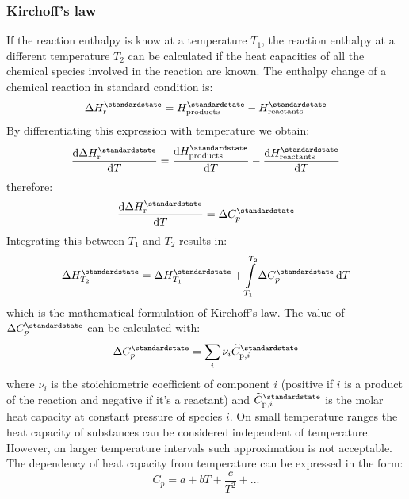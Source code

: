 \documentclass[12pt,a4paper]{report}
\newcommand*\diff{\mathop{}\!\mathrm{d}}
\begin{document}
   \subsubsection{Kirchoff's law}
   If the reaction enthalpy is know at a temperature $T_{1}$, the reaction enthalpy at a different temperature $T_{2}$ can be calculated if the heat capacities of all the chemical species involved in the reaction are known. The enthalpy change of a chemical reaction in standard condition is:
   \begin{equation*}
   \Delta H^{\standardstate}_{\mathrm{r}}=H^{\standardstate}_{\mathrm{products}}-H^{\standardstate}_{\mathrm{reactants}}
   \end{equation*}
   By differentiating this expression with temperature we obtain:
   \begin{equation*}
   \frac{\diff\Delta H^{\standardstate}_{\mathrm{r}}}{\diff T}=\frac{\diff H^{\standardstate}_{\mathrm{products}}}{\diff T}-\frac{\diff H^{\standardstate}_{\mathrm{reactants}}}{\diff T}
   \end{equation*}
   therefore:
   \begin{equation*}
   \frac{\diff\Delta H^{\standardstate}_{\mathrm{r}}}{\diff T}=\Delta C^{\standardstate}_{p}
   \end{equation*}
   Integrating this between $T_{1}$ and $T_{2}$ results in:
   \begin{equation*}
   \Delta H^{\standardstate}_{T_{2}}=\Delta H^{\standardstate}_{T_{1}}+\int\limits_{T_{1}}^{T_{2}}\Delta C^{\standardstate}_{p}\diff T
   \end{equation*}
   which is the mathematical formulation of Kirchoff's law.
   The value of $\Delta C^{\standardstate}_{p}$ can be calculated with:
   \begin{equation*}
   \Delta C^{\standardstate}_{p}=\sum\limits_{i}\nu_{i}\widetilde{C}^{\standardstate}_{\mathrm{p},i}
   \end{equation*}
   where $\nu_{i}$ is the stoichiometric coefficient of component $i$ (positive if $i$ is a product of the reaction and negative if it's a reactant) and $\widetilde{C}^{\standardstate}_{\mathrm{p},i}$ is the molar heat capacity at constant pressure of species $i$.
   On small temperature ranges the heat capacity of substances can be considered independent of temperature. However, on larger temperature intervals such approximation is not acceptable. The dependency of heat capacity from temperature can be expressed in the form:
  \begin{equation*}
  C_{p}=a+bT+\frac{c}{T^{2}}+...
  \end{equation*}
\end{document}
